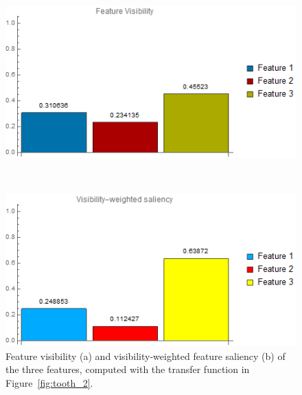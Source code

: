 \begin{figure}
	\centering
	\begin{minipage}{.45\textwidth}
		\includegraphics[width=1\linewidth]{images/tooth_balance_visibility_chart}
		\subcaption{}
	\end{minipage}~
	\begin{minipage}{.45\textwidth}
		\includegraphics[width=1\linewidth]{images/tooth_balance_visibility_saliency_weighted_chart}
		\subcaption{}
	\end{minipage}
	\caption[Feature visibility and visibility-weighted feature saliency of the three features]{Feature visibility (a) and visibility-weighted feature saliency (b) of the three features, computed with the transfer function in Figure~\ref{fig:tooth_2}.}
	\label{fig:tooth_saliency_chart_2}
\end{figure}

